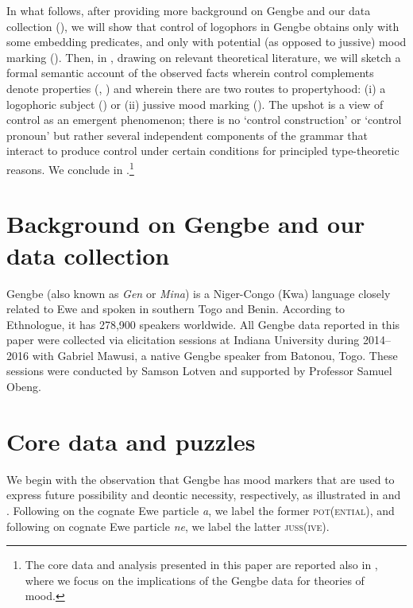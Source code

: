 \documentclass[output=paper,modfonts,nonflat]{langsci/langscibook}
\newcommand{\á}{\'{ã}}
\newcommand{\É}{\'{\~{ε}}}
\newcommand{\È}{\`{\~{ε}}}
\newcommand{\í}{\'{\~{i}}}
\newcommand{\ì}{\`{\~{i}}}
\newcommand{\Ó}{\'{\~{ɔ}}}
\newcommand{\Ò}{\`{\~{ɔ}}}
\newcommand{\ú}{\'{ũ}}
\newcommand{\ù}{\`{ũ}}
\begin{document}
In what follows, after providing more background on Gengbe and our data collection (), we will show that control of  logophors in Gengbe obtains only with some embedding predicates, and only with potential (as opposed to jussive) mood marking (). Then, in , drawing on  relevant theoretical literature, we will sketch a formal semantic account of the observed facts wherein control complements denote properties (\citealt{Chierchi1984}, \citealt{Dowty1985}) and wherein there are two routes to propertyhood: (i) a logophoric subject (\citealt{Pearson2015}) or (ii) jussive mood marking (\citealt{Zanuttini2012}). The upshot is a view of control as an emergent phenomenon; there is no `control construction' or `control pronoun' but rather several independent components of the grammar that interact to produce control under certain conditions for principled type-theoretic reasons. We conclude in .\footnote{The core data and analysis presented in this paper are reported also in \cite{GranoToappear}, where we focus on the implications of the Gengbe data for theories of mood.}

 

\section{Background on Gengbe and our data collection}
\label{sec:Grano:GengbeBackground:2}

Gengbe (also known as \emph{Gen} or \emph{Mina}) is a Niger-Congo (Kwa) language closely related to Ewe and spoken in southern Togo and Benin. According to Ethnologue, it has 278,900 speakers worldwide.  All Gengbe data reported in this paper were collected via elicitation sessions at Indiana University during 2014--2016 with Gabriel Mawusi, a native Gengbe speaker from Batonou, Togo. These sessions were conducted by Samson Lotven and supported by Professor Samuel Obeng.



\section{Core data and puzzles}
\label{sec:Grano:CoreData:3}

We begin with the observation that Gengbe has mood markers that are used to express future possibility and deontic necessity, respectively, as illustrated in  and . Following \cite{Essegbey2008} on the  cognate  Ewe particle \emph{a}, we label the former \textsc{pot}(\textsc{ential}), and following \cite{Amek2008} on  cognate Ewe particle \emph{ne}, we label the latter \textsc{juss}(\textsc{ive}).
\end{document}
